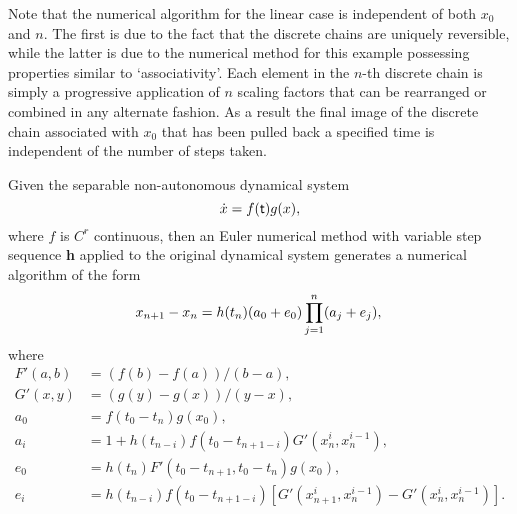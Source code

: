 Note that the numerical algorithm for the linear case is independent of both
$x_0$ and $n$. The first is due to the fact that the discrete chains
are uniquely reversible, while the latter is due to the numerical
method for this example possessing properties similar to
`associativity'.  Each element in the $n$-th discrete chain is simply a
progressive application of $n$ scaling factors that can be rearranged or
combined in any alternate fashion. As a result the final image of the discrete
chain associated with $x_0$ that has been pulled back a specified time
is independent of the number of steps taken.

\begin{lemma}
\label{lemsde} Given the separable non-autonomous dynamical system
\begin{equation} \label{eqsnde}
  \dot{x} = f( \mathsf{\mathsf{t}}) g(x),
\end{equation}
where $f$ is $C^r$ continuous, then an Euler numerical method
with variable step sequence {\bf h} applied to the original dynamical system
generates a numerical algorithm of the form
\begin{equation} \label{eqsdsnumalg}
x_{n+1} - x_n = h(t_{n}) (a_0 + e_0) \prod_{j=1}^n (a_j + e_j), \\
\end{equation}
where
\begin{align*}
  F'(a, b) &= (f(b)- f(a))/(b-a), \\
  G'(x, y) &= (g(y) - g(x))/(y - x), \\
  a_0 &= f(t_0 - t_n) g(x_0), \\
  a_i  &= 1 + h(t_{n-i}) f(t_0 - t_{n+1-i}) G'(x_n^i,x_n^{i-1}), \\
  e_0 &=  h(t_{n})F'(t_0 - t_{n+1}, t_0 - t_n) g(x_0), \\
  e_i &= h(t_{n-i}) f(t_0 - t_{n+1-i}) [ G'(x_{n+1}^i,x_n^{i-1}) -
              G'(x_n^i,x_n^{i-1}) ]. \\
\end{align*}
\end{lemma}
